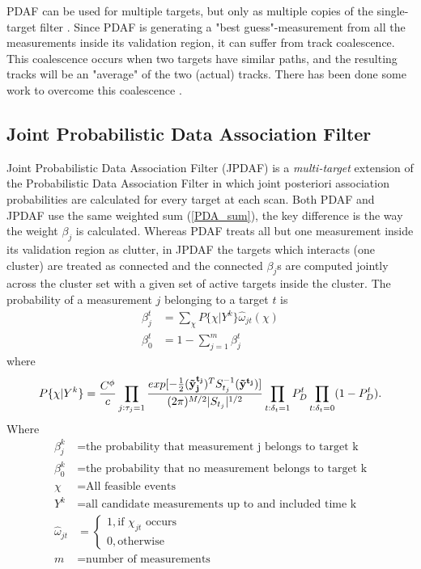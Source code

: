 PDAF can be used for multiple targets, but only as multiple copies of the single-target filter \cite{Fortmann1983}. Since PDAF is generating a "best guess"-measurement from all the measurements inside its validation region, it can suffer from track coalescence. This coalescence occurs when two targets have similar paths, and the resulting tracks will be an "average" of the two (actual) tracks. There has been done some work to overcome this coalescence \cite{Blom2000}.


\subsection{Joint Probabilistic Data Association Filter}
Joint Probabilistic Data Association Filter (JPDAF) is a \emph{multi-target} extension of the Probabilistic Data Association Filter in which joint posteriori association probabilities are calculated for every target at each scan. Both PDAF and JPDAF use the same weighted sum (\ref{PDA_sum}), the key difference is the way the weight $ \beta_j $ is calculated. Whereas PDAF treats all but one measurement inside its validation region as clutter, in JPDAF the targets which interacts (one cluster) are treated as connected and the connected $ \beta_j $s are computed jointly across the cluster set with a given set of active targets inside the cluster. The probability of a measurement $j$ belonging to a target
$ t $ is \cite{Fortmann1983}
\begin{equation}
\begin{split}
\beta_j^t &= \sum_{\chi} P\{ \chi | Y^k \} \hat{\omega}_{jt}(\chi) \\
\beta_0^t &= 1 - \sum_{j=1}^m \beta_j^t
\end{split}
\end{equation}
where
\begin{equation}
P\{\chi|Y^k\} = \frac{C^\phi}{c} 
				\prod_{j:\tau_j=1} \frac{exp[-\frac{1}{2}(\boldsymbol{\mathbf{\tilde{y}_j^{t_j}}})^T S_{t_j}^{-1}(\boldsymbol{\mathbf{\tilde{y}^{t_j}}})]}{(2\pi)^{M/2} |S_{t_j}|^{1/2}}
				\prod_{t:\delta_t=1} P_D^t
				\prod_{t:\delta_t=0} (1 - P_D^t).
\end{equation}
Where 
\begin{equation*}
\begin{split}
	\beta_j^k			&= \text{the probability that measurement j belongs to target k} \\
	\beta_0^k 			&= \text{the probability that no measurement belongs to target k} \\
	\chi 				&= \text{All feasible events} \\
	Y^k 				&= \text{all candidate measurements up to and included time k} \\
	\hat{\omega}_{jt}	&=	\begin{cases}
								1, \text{if } \chi_{jt} \text{ occurs} \\ 
								0, \text{otherwise} 
							\end{cases} \\
	m					&= \text{number of measurements}
\end{split}
\end{equation*}
